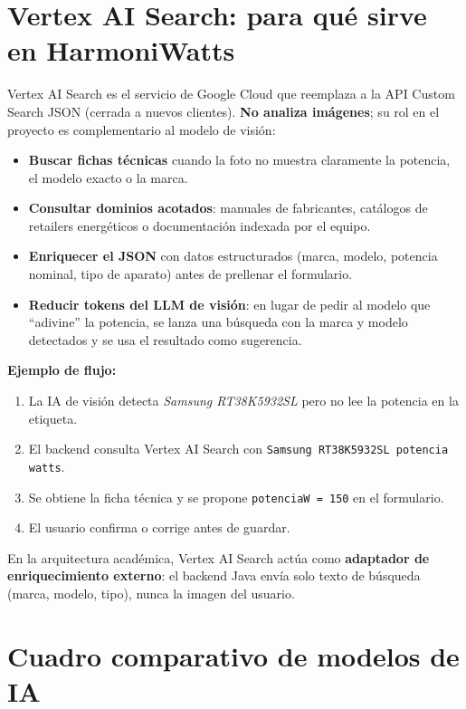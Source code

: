 \documentclass[11pt,a4paper]{article}
\begin{document}
\section{Vertex AI Search: para qué sirve en HarmoniWatts}

Vertex AI Search es el servicio de Google Cloud que reemplaza a la API Custom Search JSON (cerrada a nuevos clientes). \textbf{No analiza imágenes}; su rol en el proyecto es complementario al modelo de visión:

\begin{itemize}[leftmargin=*]
  \item \textbf{Buscar fichas técnicas} cuando la foto no muestra claramente la potencia, el modelo exacto o la marca.
  \item \textbf{Consultar dominios acotados}: manuales de fabricantes, catálogos de retailers energéticos o documentación indexada por el equipo.
  \item \textbf{Enriquecer el JSON} con datos estructurados (marca, modelo, potencia nominal, tipo de aparato) antes de prellenar el formulario.
  \item \textbf{Reducir tokens del LLM de visión}: en lugar de pedir al modelo que ``adivine'' la potencia, se lanza una búsqueda con la marca y modelo detectados y se usa el resultado como sugerencia.
\end{itemize}

\textbf{Ejemplo de flujo:}
\begin{enumerate}[leftmargin=*]
  \item La IA de visión detecta \emph{Samsung RT38K5932SL} pero no lee la potencia en la etiqueta.
  \item El backend consulta Vertex AI Search con \texttt{Samsung RT38K5932SL potencia watts}.
  \item Se obtiene la ficha técnica y se propone \texttt{potenciaW = 150} en el formulario.
  \item El usuario confirma o corrige antes de guardar.
\end{enumerate}

En la arquitectura académica, Vertex AI Search actúa como \textbf{adaptador de enriquecimiento externo}: el backend Java envía solo texto de búsqueda (marca, modelo, tipo), nunca la imagen del usuario.

\section{Cuadro comparativo de modelos de IA}
\end{document}

